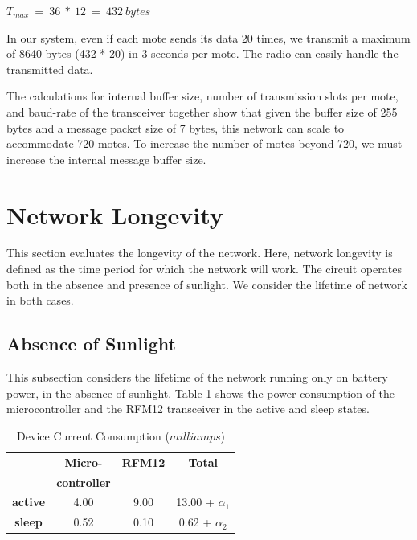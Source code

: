 \begin{center}
$T_{max}\ =\ 36\ *\ 12\ =\ 432\ bytes$
\end{center}
In our system, even if each mote sends its data 20 times, we transmit a maximum of 8640 bytes (432 * 20) in 3 seconds per mote. The radio can easily handle the transmitted data.%

The calculations for internal buffer size, number of transmission slots per mote, and baud-rate of the transceiver together show that given the buffer size of 255 bytes and a message packet size of 7 bytes, this network can scale to accommodate 720 motes. To increase the number of motes beyond 720, we must increase the internal message buffer size.


\section{Network Longevity}
This section evaluates the longevity of the network. Here, network longevity is defined as the time period for which the network will work. The circuit operates both in the absence and presence of sunlight. We consider the lifetime of network in both cases.

\subsection{Absence of Sunlight}\label{subsec:sunlight_absent}
This subsection considers the lifetime of the network running only on battery power, in the absence of sunlight. Table \ref{table_powerConsumption} shows the power consumption of the microcontroller and the RFM12 transceiver in the active and sleep states.
\begin{table}[htbp]
\begin{center}
\begin{tabular}{|c|c|c|c|}
\hline 
   & \textbf{Micro-} & \textbf{RFM12} & \textbf{Total} \\ 
  &  \textbf{controller} &  &   \\ 
\hline 
\hline 
\textbf{active} & 4.00 & 9.00 & 13.00 + $\alpha_{1}$ \\ 
\hline 
\textbf{sleep} & 0.52 & 0.10 & 0.62 + $\alpha_{2}$ \\ 
\hline 
\end{tabular}
\end{center} 
\caption{Device Current Consumption ($milliamps$)}
\label{table_powerConsumption}
\end{table}

